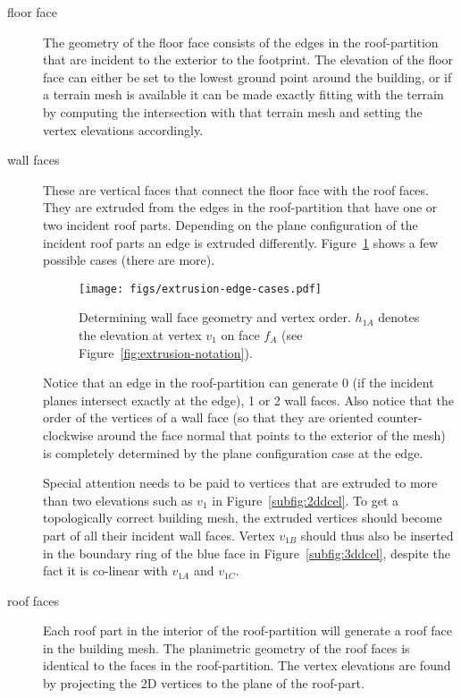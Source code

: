\begin{description}
\item[floor face] The geometry of the floor face consists of the edges in the roof-partition that are incident to the exterior to the footprint. The elevation of the floor face can either be set to the lowest ground point around the building, or if a terrain mesh is available it can be made exactly fitting with the terrain by computing the intersection with that terrain mesh and setting the vertex elevations accordingly. 

\item[wall faces] These are vertical faces that connect the floor face with the roof faces. They are extruded from the edges in the roof-partition that have one or two incident roof parts. Depending on the plane configuration of the incident roof parts an edge is extruded differently. Figure~\ref{fig:extrusion-cases} shows a few possible cases (there are more).
\begin{figure}
	\texttt{[image: figs/extrusion-edge-cases.pdf]}
	\caption{Determining wall face geometry and vertex order. $h_{1A}$ denotes the elevation at vertex $v_1$ on face $f_A$ (see Figure~\ref{fig:extrusion-notation}).}%
	\label{fig:extrusion-cases}
\end{figure}
Notice that an edge in the roof-partition can generate 0 (if the incident planes intersect exactly at the edge), 1 or 2 wall faces.
Also notice that the order of the vertices of a wall face (so that they are oriented counter-clockwise around the face normal that points to the exterior of the mesh) is completely determined by the plane configuration case at the edge.

Special attention needs to be paid to vertices that are extruded to more than two elevations such as $v_1$ in Figure~\ref{subfig:2ddcel}.
To get a topologically correct building mesh, the extruded vertices should become part of all their incident wall faces.
Vertex $v_{1B}$ should thus also be inserted in the boundary ring of the blue face in Figure~\ref{subfig:3ddcel}, despite the fact it is co-linear with $v_{1A}$ and $v_{1C}$.

\item[roof faces]  Each roof part in the interior of the roof-partition will generate a roof face in the building mesh. The planimetric geometry of the roof faces is identical to the faces in the roof-partition. The vertex elevations are found by projecting the 2D vertices to the plane of the roof-part.
\end{description}

